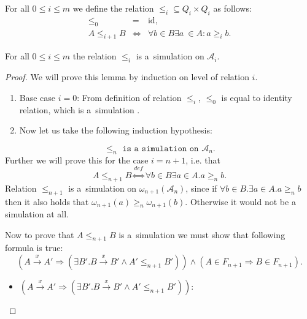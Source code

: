 \begin{defz}\label{simulation-definition}
 For all $0 \leq i \leq m$ we define the relation $\leq_i \subseteq Q_i \times
 Q_i$ as follows:
 \begin{eqnarray}
  \leq_0 & = & \text{id},\\
  A \leq_{i+1} B & \Leftrightarrow & \forall b \in B \exists a~\in A: a \geq_i
  b.
 \end{eqnarray}
\end{defz}

\begin{lemma}
 For all $0 \leq i \leq m$ the relation $\leq_i$ is a~simulation on
 $\mathcal{A}_i$.
\end{lemma}
\begin{proof}
 We will prove this lemma by induction on level of relation $i$.
 
 \begin{enumerate}
   \item Base case $i = 0$: From definition of relation $\leq_i$, $\leq_0$ is
   equal to identity relation, which is a~simulation \cite{tacas}.
   \item Now let us take the following induction hypothesis:
 \end{enumerate}
 \begin{equation}
  \leq_n \texttt{ is a simulation on } \mathcal{A}_n.
 \end{equation}
 Further we will prove this for the case $i = n+1$, i.e. that
 \begin{equation}
 A \leq_{n+1} B \overset{\mathit{def}}{\Leftrightarrow} \forall b \in B
 \exists a \in A. a \geq_n b.
 \end{equation}
 Relation $\leq_{n+1}$ is a~simulation on $\omega_{n+1}(\mathcal{A}_n)$, since
 if $\forall b \in B. \exists a \in A. a \geq_n b$ then it also holds that
 $\omega_{n+1}(a) \geq_n \omega_{n+1}(b)$. Otherwise it would not be a
 simulation at all.
 
 Now to prove that $A \leq_{n+1} B$ is a~simulation we must show that following
 formula is true:
 \begin{equation}
 (A \overset{x}{\rightarrow} A' \Rightarrow (\exists B'. B
 \overset{x}{\rightarrow} B' \wedge A' \leq_{n+1} B')) \wedge (A \in F_{n+1}
 \Rightarrow B \in F_{n+1}).
 \end{equation}
 
  \begin{itemize}
   \item $(A \overset{x}{\rightarrow} A' \Rightarrow (\exists B'. B
 \overset{x}{\rightarrow} B' \wedge A' \leq_{n+1} B'))$:
 \end{itemize}
 

\end{proof}
